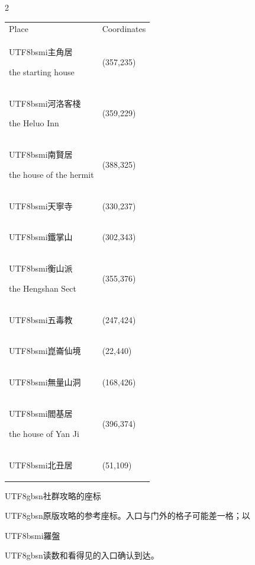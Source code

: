 \begin{paracol}{2}
{\scriptsize\begin{tabular}{@{}ll@{}}Place & Coordinates\\\begin{CJK}{UTF8}{bsmi}主角居\end{CJK} the starting house & (357,235)\\\begin{CJK}{UTF8}{bsmi}河洛客棧\end{CJK} the Heluo Inn & (359,229)\\\begin{CJK}{UTF8}{bsmi}南賢居\end{CJK} the house of the hermit & (388,325)\\\begin{CJK}{UTF8}{bsmi}天寧寺\end{CJK} & (330,237)\\\begin{CJK}{UTF8}{bsmi}鐵掌山\end{CJK} & (302,343)\\\begin{CJK}{UTF8}{bsmi}衡山派\end{CJK} the Hengshan Sect & (355,376)\\\begin{CJK}{UTF8}{bsmi}五毒教\end{CJK} & (247,424)\\\begin{CJK}{UTF8}{bsmi}崑崙仙境\end{CJK} & (22,440)\\\begin{CJK}{UTF8}{bsmi}無量山洞\end{CJK} & (168,426)\\\begin{CJK}{UTF8}{bsmi}閻基居\end{CJK} the house of Yan Ji & (396,374)\\\begin{CJK}{UTF8}{bsmi}北丑居\end{CJK} & (51,109)\end{tabular}\par}
\switchcolumn
\footnotesize\setlength{\parskip}{2pt}
{\footnotesize\bfseries \begin{CJK}{UTF8}{gbsn}社群攻略的座标\end{CJK}\par}
\begin{CJK}{UTF8}{gbsn}原版攻略的参考座标。入口与门外的格子可能差一格；以\end{CJK}\begin{CJK}{UTF8}{bsmi}羅盤\end{CJK}\begin{CJK}{UTF8}{gbsn}读数和看得见的入口确认到达。\end{CJK}\par

\end{paracol}
